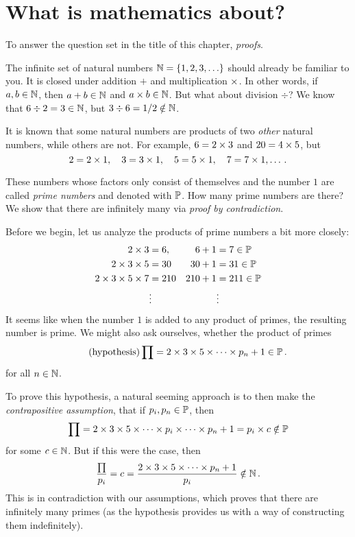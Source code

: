 \section{What is mathematics about?}%
\label{sec:what-is-math-about}

To answer the question set in the title of this chapter, \emph{proofs}.

\begin{example}
The infinite set of natural numbers \(\mathbb{N} = \{1, 2, 3, \ldots\}\) should already be familiar to you.
It is closed under addition \(+\) and multiplication \(\times\).
In other words, if \(a, b\in\mathbb{N}\), then \(a + b \in\mathbb{N}\) and \(a\times b\in\mathbb{N}\).
But what about division \(\div\)? We know that \(6 \div 2 = 3 \in\mathbb{N}\),
but \(3\div 6 = 1 / 2 \notin\mathbb{N}\).

It is known that some natural numbers are products of two \emph{other} natural numbers,
while others are not. For example, \(6 = 2 \times 3\) and \(20 = 4 \times 5\),
but
\[
2 = 2\times 1,
\quad
3 = 3\times 1,
\quad
5 = 5 \times 1,
\quad
7 = 7 \times 1,
\ldots\,.
\]
\end{example}
These numbers whose factors only consist of themselves and the number \(1\) are called \emph{prime numbers}
and denoted with \(\mathbb{P}\). How many prime numbers are there? We show that there are infinitely many via
\emph{proof by contradiction}.

Before we begin, let us analyze the products of prime numbers a bit more closely:
\begin{align*}
    2 \times 3                   &= 6,   & 6 + 1     &= 7 \in\mathbb{P} \\
    2\times 3 \times 5            &= 30   & 30 + 1    &= 31 \in\mathbb{P} \\
    2 \times 3 \times 5 \times 7   &= 210  & 210 + 1   &= 211\in\mathbb{P}\\
                                &\vdots &           &\vdots
\end{align*}
It seems like when the number \(1\) is added to any product of primes, the resulting number is prime.
We might also ask ourselves, whether the product of primes
\begin{equation*}\tag{hypothesis}
    \prod = 2 \times 3 \times 5 \times\cdots\times p_n + 1 \in\mathbb{P} \,.
\end{equation*}
for all \(n\in\mathbb{N}\).

To prove this hypothesis, a natural seeming approach is to then make the \emph{contrapositive assumption},
that if \(p_i, p_n\in\mathbb{P}\), then
\begin{equation}
    \prod = 2\times 3 \times 5 \times \cdots \times p_i\times\cdots\times p_n + 1 = p_i\times c\notin\mathbb{P}
\end{equation}
for some \(c\in\mathbb{N}\). But if this were the case, then
\begin{equation*}
    \frac\prod {p_i} = c = \frac{2 \times 3 \times 5 \times \cdots \times p_n + 1}{p_i} \notin\mathbb{N}\,.
\end{equation*}
This is in contradiction with our assumptions, which proves that there are infinitely many primes
(as the hypothesis provides us with a way of constructing them indefinitely).

